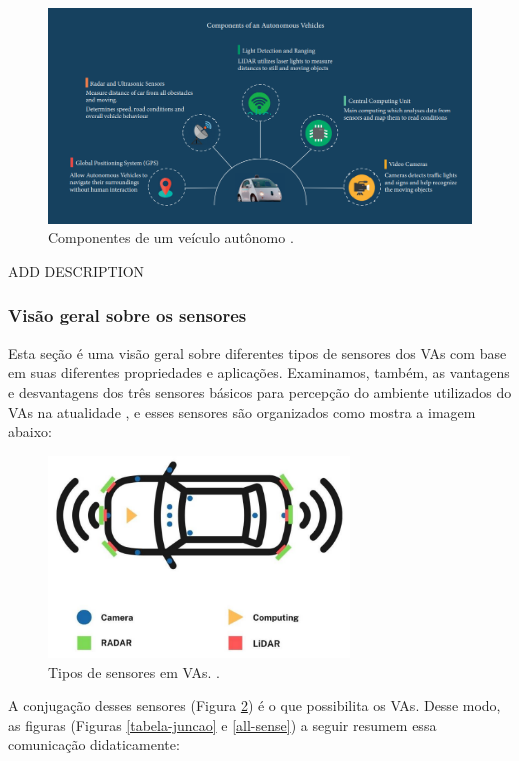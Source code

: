 \begin{figure}[H]
\centering
\includegraphics[width=\textwidth]{Figures/compo.png}
\caption{Componentes de um veículo autônomo \cite{aplicacao2}.}
\label{figura_compone}
\end{figure}


ADD DESCRIPTION 

\subsubsection{Visão geral sobre os sensores}

Esta seção é uma visão geral sobre diferentes tipos de sensores dos VAs com base em suas diferentes propriedades e aplicações. Examinamos, também, as vantagens e desvantagens dos três sensores básicos para percepção do ambiente utilizados do VAs na atualidade \cite{sensors}, e esses sensores são organizados como mostra a imagem abaixo:


\begin{figure}[H]
\centering
\includegraphics[width=8cm]{Figures/sensores.png}
\caption{Tipos de sensores em VAs. \cite{review-auto}.}
\label{figura-sensores}
\end{figure}


A conjugação desses sensores (Figura \ref{figura-sensores}) é o que possibilita os VAs. Desse modo, as figuras (Figuras \ref{tabela-juncao} e \ref{all-sense}) a seguir resumem essa comunicação didaticamente:

